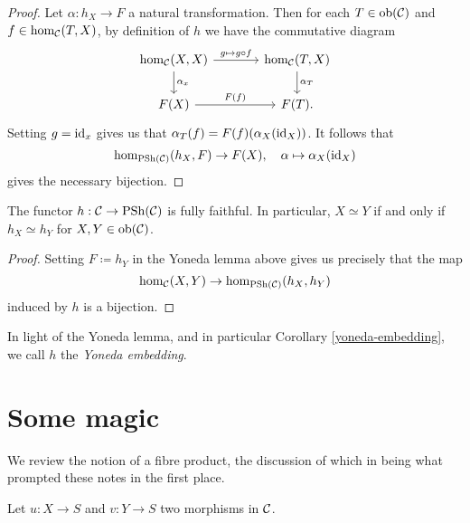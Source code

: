 \begin{proof}
  Let $\alpha : h_X \to F$ a natural transformation. Then for each $T
  \in {\operatorname{\textup{ob}}}(\mathcal{C})$ and $f \in {\operatorname{\textup{hom}}}_{\mathcal{C}}(T,X)$, by definition of $h$ we have
  the commutative diagram
  \[
  \begin{tikzcd}[column sep = large]
    \hom_\C(X,X) \rar{g \mapsto g \circ f} \dar{\alpha_x} &
    \hom_\C(T,X) \dar{\alpha_T} \\ F(X) \rar{F(f)} & F(T).
  \end{tikzcd}
  \]
  Setting $g = {\operatorname{\textup{id}}}_x$
  gives us that $\alpha_T(f) = F(f)(\alpha_X({\operatorname{\textup{id}}}_X))$. It follows that
  \[
  {\operatorname{\textup{hom}}}_{{\operatorname{\textup{PSh}}}(\mathcal{C})}(h_X, F) \to F(X), \quad \alpha \mapsto
  \alpha_X({\operatorname{\textup{id}}}_X)
  \]
  gives the necessary bijection.
\end{proof}

\begin{corollary}
  \label{yoneda-embedding}
  The functor $h : \mathcal{C} \to {\operatorname{\textup{PSh}}}(\mathcal{C})$ is fully faithful. In particular, $X
  \simeq Y$ if and only if $h_X \simeq h_Y$ for $X,Y \in {\operatorname{\textup{ob}}}(\mathcal{C})$.
\end{corollary}

\begin{proof}
  Setting $F \coloneqq h_Y$ in the Yoneda lemma above gives us
  precisely that the map
  \[
  {\operatorname{\textup{hom}}}_{\mathcal{C}}(X,Y) \to {\operatorname{\textup{hom}}}_{{\operatorname{\textup{PSh}}}(\mathcal{C})}(h_X,h_Y)
  \]
  induced by $h$ is a bijection.
\end{proof}

\begin{remark}
  In light of the Yoneda lemma, and in particular Corollary
  \ref{yoneda-embedding}, we call $h$ the \textit{Yoneda embedding}.
\end{remark}


\section{Some magic}

We review the notion of a fibre product, the discussion of which in
\cite{gortzwedhorn} being what prompted these notes in the first
place.

\begin{situation}
  \label{fibre}
  Let $u : X \to S$ and $v : Y \to S$ two morphisms in $\mathcal{C}$.
\end{situation}

